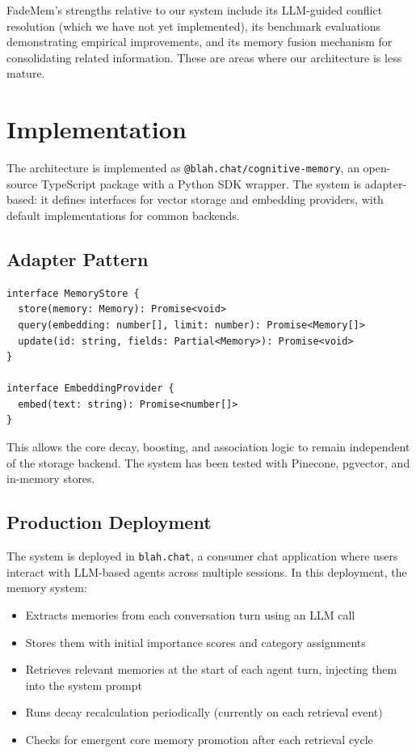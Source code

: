 \documentclass[11pt,a4paper]{article}
\begin{document}
FadeMem's strengths relative to our system include its LLM-guided conflict resolution (which we have not yet implemented), its benchmark evaluations demonstrating empirical improvements, and its memory fusion mechanism for consolidating related information. These are areas where our architecture is less mature.

\section{Implementation}

The architecture is implemented as \texttt{@blah.chat/cognitive-memory}, an open-source TypeScript package with a Python SDK wrapper. The system is adapter-based: it defines interfaces for vector storage and embedding providers, with default implementations for common backends.

\subsection{Adapter Pattern}

\begin{verbatim}
interface MemoryStore {
  store(memory: Memory): Promise<void>
  query(embedding: number[], limit: number): Promise<Memory[]>
  update(id: string, fields: Partial<Memory>): Promise<void>
}

interface EmbeddingProvider {
  embed(text: string): Promise<number[]>
}
\end{verbatim}

This allows the core decay, boosting, and association logic to remain independent of the storage backend. The system has been tested with Pinecone, pgvector, and in-memory stores.

\subsection{Production Deployment}

The system is deployed in \texttt{blah.chat}, a consumer chat application where users interact with LLM-based agents across multiple sessions. In this deployment, the memory system:

\begin{itemize}
    \item Extracts memories from each conversation turn using an LLM call
    \item Stores them with initial importance scores and category assignments
    \item Retrieves relevant memories at the start of each agent turn, injecting them into the system prompt
    \item Runs decay recalculation periodically (currently on each retrieval event)
    \item Checks for emergent core memory promotion after each retrieval cycle
\end{itemize}
\end{document}
